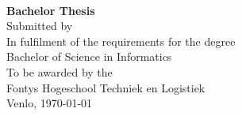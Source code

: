 \begin{titlepage}

\center %


\vspace*{3cm}

{\huge \bfseries \thesistitle} \\[0.5cm] %
{\large \bfseries Bachelor Thesis } \\[4cm]
 

{\normalsize	Submitted by \student}\\[2cm] %

{\normalsize	In fulfilment of the requirements for the degree \\
Bachelor of Science in Informatics \\
To be awarded by the \\
Fontys Hogeschool Techniek en Logistiek
}\\[4cm]%

{\normalsize Venlo, \today}



\vfill %

\end{titlepage}